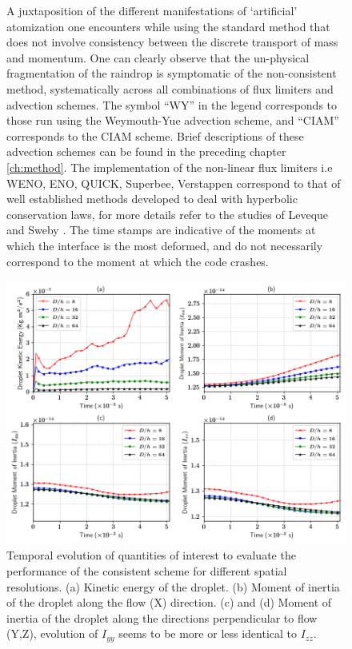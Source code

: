 \begin{figure}
\begin{center}
\end{center}
\vspace*{-0.5cm}
\caption{A juxtaposition of the different manifestations of  
`artificial' atomization one encounters while using the standard 
method that does not involve consistency between the discrete transport
of mass and momentum. One can clearly observe that the un-physical
fragmentation of the raindrop is symptomatic of the non-consistent 
method, systematically across all combinations of flux limiters and advection schemes. 
The symbol ``WY'' in the legend corresponds to those run using 
the Weymouth-Yue advection scheme, and ``CIAM'' corresponds to the CIAM scheme. 
Brief descriptions of these advection schemes can be found in the preceding chapter \ref{ch:method}.
The implementation of the non-linear flux limiters i.e WENO, ENO, QUICK, Superbee, Verstappen 
correspond to that of well established methods developed to 
deal with hyperbolic conservation laws, for more details refer to the
studies of Leveque \cite{flim_1} and Sweby \cite{flim_2}.
The time stamps are indicative of the moments at which the interface
is the most deformed, and do not necessarily correspond to the moment
at which the code crashes.} 
\label{explode_all}
\end{figure}

\begin{figure}
\begin{center}
\includegraphics[width = 1.5\textwidth]{plots/raindrop/multiplot_raindrop.png}
\end{center}
\vspace*{-0.5cm}
\caption{Temporal evolution of quantities of interest to evaluate the 
performance of the consistent scheme for different spatial resolutions. 
(a) Kinetic energy of the droplet. 
(b) Moment of inertia of the droplet along the flow (X) direction. 
(c) and (d) Moment of inertia of the droplet along the directions 
perpendicular to flow (Y,Z), evolution of $I_{yy}$ 
seems to be more or less identical to $I_{zz}$.}
\label{multi}
\end{figure}

